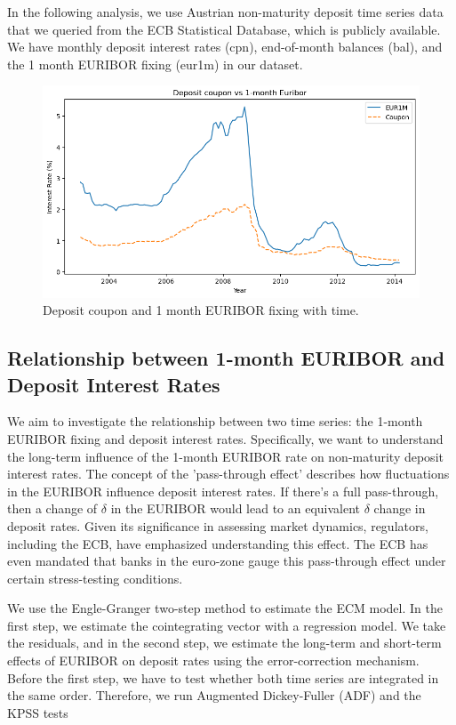 \documentclass[11pt]{article}
\begin{document}
In the following analysis, we use Austrian non-maturity deposit time series data that we queried from the ECB Statistical Database, which is publicly available. We have monthly deposit interest rates (cpn), end-of-month balances (bal), and the 1 month EURIBOR fixing (eur1m) in our dataset.
\begin{figure}[ht!]
	\centering
	\includegraphics[scale=0.6]{images/cpn_erb}
	\caption{Deposit coupon and 1 month EURIBOR fixing with time.}	
\end{figure}

\subsection{Relationship between 1-month EURIBOR and Deposit Interest Rates}

We aim to investigate the relationship between two time series: the 1-month EURIBOR fixing and deposit interest rates. Specifically, we want to understand the long-term influence of the 1-month EURIBOR rate on non-maturity deposit interest rates. The concept of the 'pass-through effect' describes how fluctuations in the EURIBOR influence deposit interest rates. If there's a full pass-through, then a change of $\delta$ in the EURIBOR would lead to an equivalent $\delta$ change in deposit rates. Given its significance in assessing market dynamics, regulators, including the ECB, have emphasized understanding this effect. The ECB has even mandated that banks in the euro-zone gauge this pass-through effect under certain stress-testing conditions.




We use the Engle-Granger two-step method to estimate the ECM model. In the first step, we estimate the cointegrating vector with a regression model. We take the residuals, and in the second step, we estimate the long-term and short-term effects of EURIBOR on deposit rates using the error-correction mechanism. Before the first step, we have to test whether both time series are integrated in the same order. Therefore, we run Augmented Dickey-Fuller (ADF) and the KPSS tests

\subsubsection{}
\end{document}
